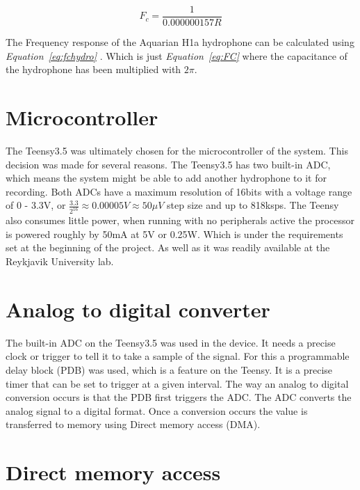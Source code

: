 \clearpage

\begin{equation}
    F_c = \frac{1}{ 0.000000157 R}  
\label{eq:fchydro}
\end{equation}

The Frequency response of the Aquarian H1a hydrophone can be calculated using \textit{Equation~\ref{eq:fchydro}} \cite{noauthor_aquarian_nodate}. 
Which is just \textit{Equation~\ref{eq:FC}} where the capacitance of the hydrophone has been multiplied with $2\pi$.



\section{Microcontroller}
The Teensy3.5 was ultimately chosen for the microcontroller of the system.
This decision was made for several reasons.
The Teensy3.5 has two built-in ADC, which means the system might be able to add another hydrophone to it for recording.
Both ADCs have a maximum resolution of 16bits with a voltage range of 0 - 3.3V, or $\frac{3.3}{2^{16}} \approx 0.00005V \approx 50\mu V$ step size and up to 818ksps.
The Teensy also consumes little power, when running with no peripherals active the processor is powered roughly by 50mA at 5V or 0.25W.
Which is under the requirements set at the beginning of the project.
As well as it was readily available at the Reykjavik University lab.


\section{Analog to digital converter}

The built-in ADC on the Teensy3.5 was used in the device.
It needs a precise clock or trigger to tell it to take a sample of the signal.
For this a programmable delay block (PDB) was used, which is a feature on the Teensy. 
It is a precise timer that can be set to trigger at a given interval.
The way an analog to digital conversion occurs is that the PDB first triggers the ADC.
The ADC converts the analog signal to a digital format.
Once a conversion occurs the value is transferred to memory using Direct memory access (DMA).

\clearpage

\section{Direct memory access}

